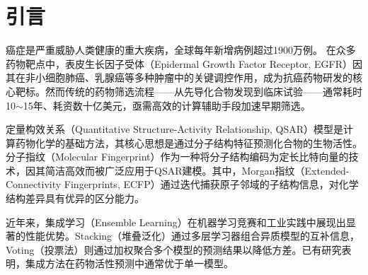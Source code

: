 \documentclass[12pt,a4paper]{article}
\begin{document}
\begin{abstract}
抗癌药物的早期筛选是新药研发的关键瓶颈。本文以表皮生长因子受体（EGFR）抑制剂为研究对象，从ChEMBL数据库获取1830个具有IC$_{50}$活性数据的小分子化合物，利用RDKit计算190个分子描述符与2048位Morgan指纹（ECFP4）作为分子表征，经数据清洗、冗余特征去除与Mutual Information特征选择后保留1000维高信息量特征。在此基础上，训练MLP神经网络、随机森林、梯度提升树、支持向量机、Extra Trees和KNN共6种异质基学习器，并通过Stacking与加权Voting两种集成策略进行融合。经RandomizedSearchCV超参数调优后，优化Stacking集成模型在测试集上取得回归$R^2 = 0.631$、$\text{RMSE} = 0.720$，分类$\text{AUC} = 0.934$、准确率$92.9\%$的最佳性能，相比最优单模型分别提升3.2\%和0.6\%。虚拟筛选实验表明，模型能以91.8\%的准确率从测试分子中正确区分活性与非活性化合物。本研究验证了集成学习在基于分子指纹的药物虚拟筛选中的有效性，为抗癌先导化合物的快速发现提供了可行的计算方案。

\noindent\textbf{关键词：} 集成学习；分子指纹；EGFR抑制剂；虚拟筛选；QSAR；Stacking
\end{abstract}

\clearpage
\tableofcontents
\clearpage
\listoftables
\listoffigures

\clearpage

\section{引言}

癌症是严重威胁人类健康的重大疾病，全球每年新增病例超过1900万例。 在众多药物靶点中，表皮生长因子受体（Epidermal Growth Factor Receptor, EGFR）因其在非小细胞肺癌、乳腺癌等多种肿瘤中的关键调控作用，成为抗癌药物研发的核心靶标。然而传统的药物筛选流程——从先导化合物发现到临床试验——通常耗时10$\sim$15年、耗资数十亿美元，亟需高效的计算辅助手段加速早期筛选。

定量构效关系（Quantitative Structure-Activity Relationship, QSAR）模型是计算药物化学的基础方法，其核心思想是通过分子结构特征预测化合物的生物活性。分子指纹（Molecular Fingerprint）作为一种将分子结构编码为定长比特向量的技术，因其简洁高效而被广泛应用于QSAR建模。其中，Morgan指纹（Extended-Connectivity Fingerprints, ECFP）通过迭代捕获原子邻域的子结构信息，对化学结构差异具有优异的区分能力。

近年来，集成学习（Ensemble Learning）在机器学习竞赛和工业实践中展现出显著的性能优势。Stacking（堆叠泛化）通过多层学习器组合异质模型的互补信息，Voting（投票法）则通过加权聚合多个模型的预测结果以降低方差。已有研究表明，集成方法在药物活性预测中通常优于单一模型。
\end{document}
